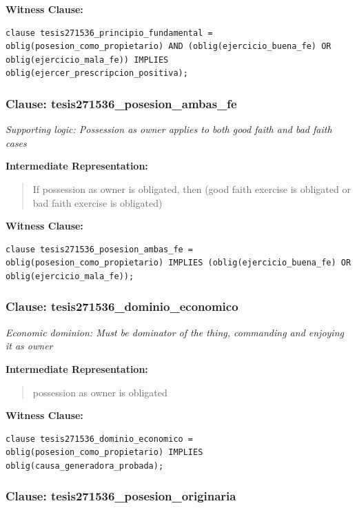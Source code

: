 \documentclass[11pt,a4paper]{article}
\begin{document}
\textbf{Witness Clause:}

\begin{lstlisting}[style=witnessstyle, language=Witness]
clause tesis271536_principio_fundamental = oblig(posesion_como_propietario) AND (oblig(ejercicio_buena_fe) OR oblig(ejercicio_mala_fe)) IMPLIES oblig(ejercer_prescripcion_positiva);
\end{lstlisting}

\subsubsection{Clause: tesis271536\_posesion\_ambas\_fe}

\textit{Supporting logic: Possession as owner applies to both good faith and bad faith cases}

\textbf{Intermediate Representation:}

\begin{quote}
If possession as owner is obligated, then (good faith exercise is obligated or bad faith exercise is obligated)
\end{quote}

\textbf{Witness Clause:}

\begin{lstlisting}[style=witnessstyle, language=Witness]
clause tesis271536_posesion_ambas_fe = oblig(posesion_como_propietario) IMPLIES (oblig(ejercicio_buena_fe) OR oblig(ejercicio_mala_fe));
\end{lstlisting}

\subsubsection{Clause: tesis271536\_dominio\_economico}

\textit{Economic dominion: Must be dominator of the thing, commanding and enjoying it as owner}

\textbf{Intermediate Representation:}

\begin{quote}
possession as owner is obligated
\end{quote}

\textbf{Witness Clause:}

\begin{lstlisting}[style=witnessstyle, language=Witness]
clause tesis271536_dominio_economico = oblig(posesion_como_propietario) IMPLIES oblig(causa_generadora_probada);
\end{lstlisting}

\subsubsection{Clause: tesis271536\_posesion\_originaria}
\end{document}
